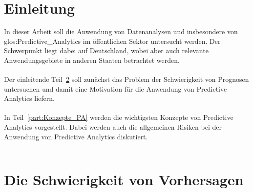 \chapter{Einleitung}

In dieser Arbeit soll die Anwendung von Datenanalysen und insbesondere
von \gls{glos:Predictive_Analytics} im öffentlichen Sektor untersucht werden.
Der Schwerpunkt liegt dabei auf Deutschland, wobei aber auch relevante
Anwendungsgebiete in anderen Staaten betrachtet werden. \\ \\
Der einleitende Teil~\ref{part:Schw_Vorhersagen} soll zunächst das Problem der
Schwierigkeit von
Prognosen untersuchen und damit eine Motivation für die Anwendung von Predictive
Analytics liefern. \\ \\
In Teil~\ref{part:Konzepte_PA} werden die wichtigsten Konzepte von Predictive
Analytics vorgestellt. Dabei werden auch die allgemeinen Risiken bei der
Anwendung von Predictive Analytics diskutiert. \\ \\

\chapter{Die Schwierigkeit von Vorhersagen}
\label{part:Schw_Vorhersagen}
